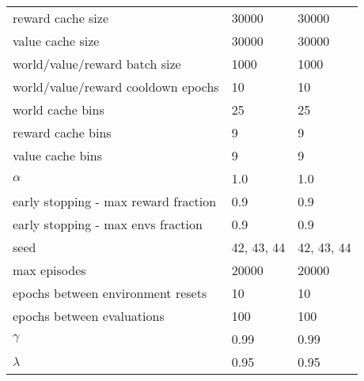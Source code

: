 \begin{tabular}{ l l l}
	reward cache size & 30000 & 30000 \\
	value cache size & 30000 & 30000 \\
	world/value/reward batch size & 1000 & 1000 \\
	world/value/reward cooldown epochs & 10 & 10 \\
	world cache bins & 25 & 25 \\
	reward cache bins & 9 & 9 \\
	value cache bins & 9 & 9 \\
	$\alpha$ & 1.0 & 1.0 \\
	early stopping - max reward fraction & 0.9 & 0.9 \\
	early stopping - max envs fraction & 0.9 & 0.9 \\
	seed & {42, 43, 44} & {42, 43, 44} \\
	max episodes & 20000 & 20000 \\
	epochs between environment resets & 10 & 10 \\
	epochs between evaluations & 100 & 100 \\
	$\gamma$ & 0.99 & 0.99 \\
	$\lambda$ & 0.95 & 0.95 \\
	\bottomrule
\end{tabular}

